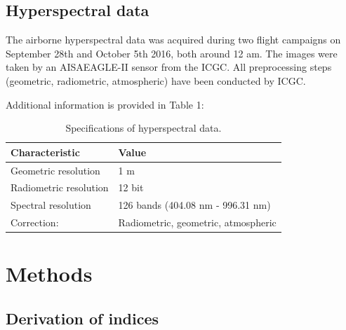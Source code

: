\documentclass[review]{elsarticle}
\begin{document}


\cite{Brenning2012}


\subsection{Hyperspectral data}

The airborne hyperspectral data was acquired during two flight campaigns on September 28th and October 5th 2016, both around 12 am.
The images were taken by an AISAEAGLE-II sensor from the \ac{ICGC}.
All preprocessing steps (geometric, radiometric, atmospheric) have been conducted by \ac{ICGC}.

Additional information is provided in Table 1:

\begin{table}[b!]
\centering
\caption[t]{Specifications of hyperspectral data.}
\begingroup\footnotesize
\begin{tabular}{ll}
	\\
	Characteristic         & Value                               \\
	\hline
	Geometric resolution   & 1 m                                 \\
	Radiometric resolution & 12 bit                              \\
	Spectral resolution    & 126 bands (404.08 nm - 996.31 nm)   \\
	Correction:            & Radiometric, geometric, atmospheric
\end{tabular}
\endgroup
\label{tab:hyperparameter_limits}
\end{table}



\section{Methods}

\subsection{Derivation of indices}
\end{document}

